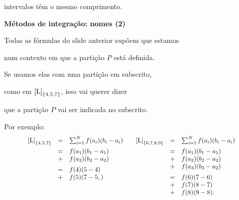 \documentclass[oneside,12pt]{article}
\begin{document}
intervalos têm o mesmo comprimento.

\newpage


{\bf Métodos de integração: nomes (2)}

\ssk

Todas as fórmulas do slide anterior supõem que estamos

num contexto em que a partição $P$ está definida.

Se usamos elas com uma partição em subscrito,

como em $\text{[L]}_{\{4,5,7\}}$, isso vai querer dizer

que a partição $P$ vai ser indicada no subscrito.

Por exemplo:
%
$$\scalebox{0.9}{$
  \begin{array}[t]{rcl}
  \mname{L}_{\{4,5,7\}} &=& \sumiN {f(a_i)} \\[5pt]
                        &=& f(a_1)(b_1-a_1) \\
                        &+& f(a_2)(b_2-a_2) \\[5pt]
                        &=& f(4)  (5-4) \\
                        &+& f(5)  (7-5,) \\
  \end{array}
  \quad
  \begin{array}[t]{rcl}
  \mname{L}_{\{6,7,8,9\}} &=& \sumiN {f(a_i)} \\[5pt]
                          &=& f(a_1)(b_1-a_1) \\
                          &+& f(a_2)(b_2-a_2) \\
                          &+& f(a_3)(b_3-a_2) \\[5pt]
                          &=& f(6)  (7-6) \\
                          &+& f(7)  (8-7) \\
                          &+& f(8)  (9-8). \\
  \end{array}
  $}
$$




\newpage

\end{document}
